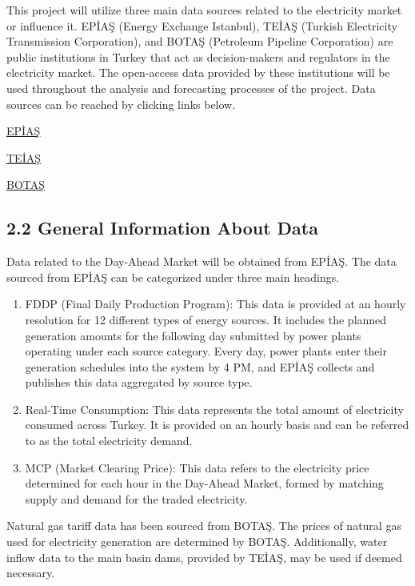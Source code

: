 \documentclass[
]{article}
\begin{document}
This project will utilize three main data sources related to the
electricity market or influence it. EPİAŞ (Energy Exchange Istanbul),
TEİAŞ (Turkish Electricity Transmission Corporation), and BOTAŞ
(Petroleum Pipeline Corporation) are public institutions in Turkey that
act as decision-makers and regulators in the electricity market. The
open-access data provided by these institutions will be used throughout
the analysis and forecasting processes of the project. Data sources can
be reached by clicking links below.

\href{https://seffaflik.epias.com.tr/home}{EPİAŞ}

\href{https://www.teias.gov.tr/sektor-raporlari}{TEİAŞ}

\href{https://www.botas.gov.tr/Sayfa/satis-fiyat-tarifesi/439}{BOTAŞ}

\subsection{2.2 General Information About
Data}\label{general-information-about-data}

Data related to the Day-Ahead Market will be obtained from EPİAŞ. The
data sourced from EPİAŞ can be categorized under three main headings.

\begin{enumerate}
\def\labelenumi{\arabic{enumi})}
\item
  FDDP (Final Daily Production Program): This data is provided at an
  hourly resolution for 12 different types of energy sources. It
  includes the planned generation amounts for the following day
  submitted by power plants operating under each source category. Every
  day, power plants enter their generation schedules into the system by
  4 PM, and EPİAŞ collects and publishes this data aggregated by source
  type.
\item
  Real-Time Consumption: This data represents the total amount of
  electricity consumed across Turkey. It is provided on an hourly basis
  and can be referred to as the total electricity demand.
\item
  MCP (Market Clearing Price): This data refers to the electricity price
  determined for each hour in the Day-Ahead Market, formed by matching
  supply and demand for the traded electricity.
\end{enumerate}

Natural gas tariff data has been sourced from BOTAŞ. The prices of
natural gas used for electricity generation are determined by BOTAŞ.
Additionally, water inflow data to the main basin dams, provided by
TEİAŞ, may be used if deemed necessary.
\end{document}
